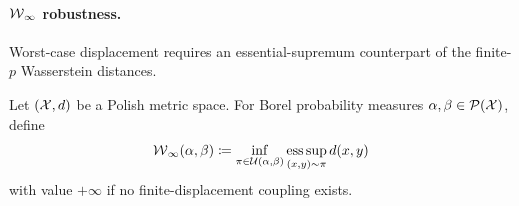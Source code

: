 \paragraph{\texorpdfstring{$\operatorname{\mathcal{W}}_\infty$}{W-infinity} robustness.}

Worst-case displacement requires an essential-supremum counterpart of the finite-$p$ Wasserstein distances.
\begin{defn}\label{def-wasserstein-infinity}
Let $(\mathcal{X},d)$ be a Polish metric space. For Borel probability measures $\alpha,\beta\in\mathcal{P}(\mathcal{X})$, define
\begin{equation}\label{eq-wass-infty}
	\operatorname{\mathcal{W}}_\infty(\alpha,\beta)
	\coloneqq
	\inf_{\pi\in\mathcal{U}(\alpha,\beta)}
	\operatorname*{ess\,sup}_{(x,y)\sim\pi} d(x,y)
\end{equation}
with value $+\infty$ if no finite-displacement coupling exists.
\end{defn}

